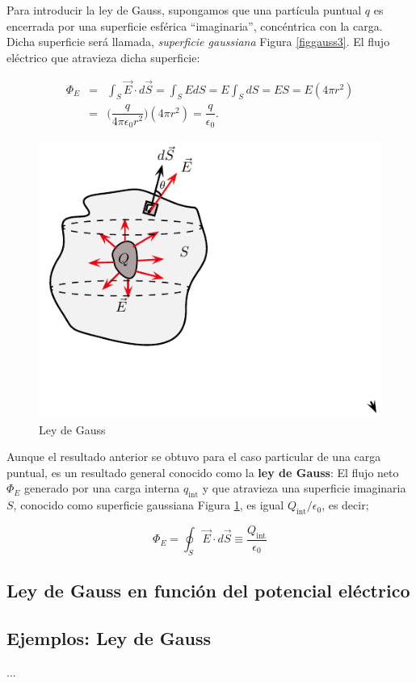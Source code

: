 Para introducir la ley de Gauss, supongamos que una partícula puntual $q$ es encerrada por una superficie esférica ``imaginaria'', concéntrica con la carga. Dicha superficie será llamada, \textit{superficie gaussiana} Figura \ref{figgauss3}. El flujo eléctrico que atravieza dicha superficie:

\begin{eqnarray}
\nonumber
\Phi_E &=& \int_S \vec{E} \cdot d\vec{S} = \int_S E dS = E \int_S dS = E S =E (4\pi r^2) \\
&=& \big(\dfrac{q}{4\pi \epsilon_0 r^2 } \big) (4\pi r^2) = \dfrac{q}{\epsilon_0 } .
\end{eqnarray}

\begin{figure}[h]
\begin{center}
\includegraphics[scale=0.8]{electrostatica/gauss2}
\end{center}
\caption{Ley de Gauss}
\label{figgauss2}
\end{figure}

Aunque el resultado anterior se obtuvo para el caso particular de una carga puntual, es un resultado general conocido  como la \textbf{ley de Gauss}: El flujo neto $\Phi_E$ generado por una carga interna $q_{\mbox{int}}$  y que atravieza una superficie imaginaria $S$, conocido como superficie gaussiana Figura \ref{figgauss2}, es igual $Q_{\mbox{int}}/\epsilon_0$, es decir;

\begin{equation}
\boxed{\Phi_E =  \displaystyle\oint _S \vec{E} \cdot d\vec{S} \equiv \dfrac{Q_{\mbox{int}}}{\epsilon_0 } } 
\end{equation}

\subsection{Ley de Gauss en función del potencial eléctrico}

\subsection{Ejemplos: Ley de Gauss}

...

%


